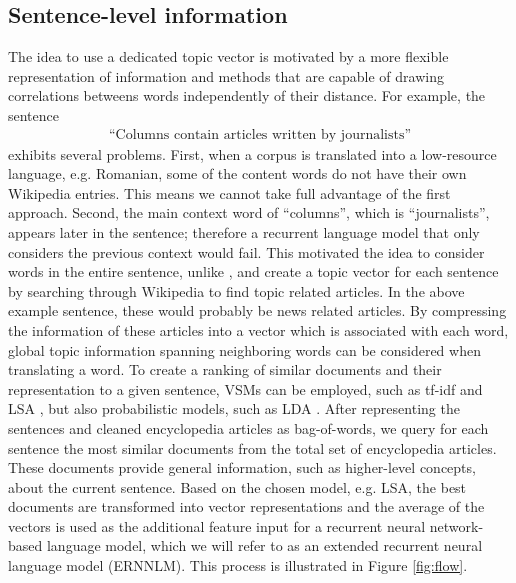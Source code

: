 \documentclass[a4paper]{article}
\begin{document}
\subsection{Sentence-level information} \label{sec:sentence-level}
The idea to use a dedicated topic vector is motivated by a more flexible representation of information and methods that are capable of drawing correlations betweens words independently of their distance.
For example, the sentence 
\begin{align}
\text{``Columns contain articles written by journalists''}
\end{align}
exhibits several problems. First, when a corpus is translated into a low-resource language, e.g. Romanian, some of the content words do not have their own Wikipedia entries. This means we cannot take full advantage of the first approach. Second, the main context word of ``columns'', which is ``journalists'', appears later in the sentence; therefore a recurrent language model that only considers the previous context would fail. 
This motivated the idea to consider words in the entire sentence, unlike \cite{mikolov2012context}, and create a topic vector for each sentence by searching through Wikipedia to find topic related articles. In the above example sentence, these would probably be news related articles. By compressing the information of these articles into a vector which is associated with each word, global topic information spanning neighboring words can be considered when translating a word. 
To create a ranking of similar documents and their representation to a given sentence, VSMs can be employed, such as tf-idf \cite{salton1986introduction} and LSA \cite{bradford2008empirical}, but also probabilistic models, such as LDA \cite{blei2003latent}. After representing the sentences and cleaned encyclopedia articles as bag-of-words, we query for each sentence the most similar documents from the total set of encyclopedia articles. These documents provide general information, such as higher-level concepts, about the current sentence. Based on the chosen model, e.g. LSA, the best documents are transformed into vector representations and the average of the vectors is used as the additional feature input for a recurrent neural network-based language model, which we will refer to as an extended recurrent neural language model (ERNNLM). This process is illustrated in Figure \ref{fig:flow}.
\end{document}
